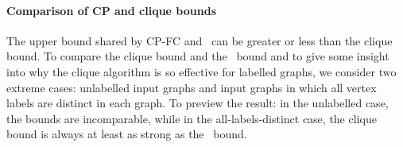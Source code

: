
%

\paragraph{Comparison of CP and clique bounds}
The upper bound shared by CP-FC and \McSplit\ can be greater or less than the clique bound.
To compare the clique bound and the \McSplit\ bound and to give some
insight into why the clique algorithm is so effective for labelled
graphs, we consider two extreme
cases: unlabelled input graphs and input graphs in which all vertex labels are
distinct in each graph.  To preview the result: in the unlabelled case,
the bounds are incomparable, while in the all-labels-distinct case,
the clique bound is always at least as strong as the \McSplit\ bound.

